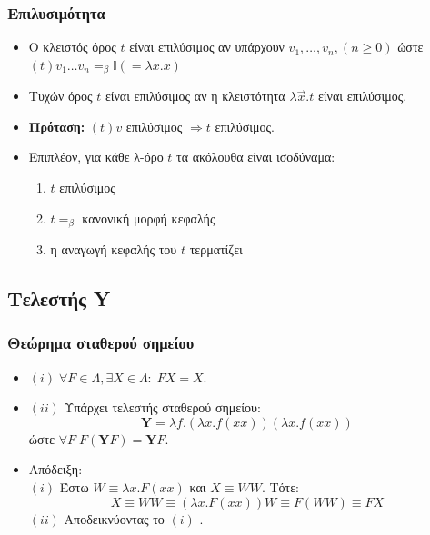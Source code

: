 \documentclass{beamer}
\begin{document}
\begin{frame}
  \frametitle{Επιλυσιμότητα}
  \begin{itemize}
  \item Ο κλειστός όρος $t$ είναι επιλύσιμος αν υπάρχουν $v_1, \ldots,
    v_n, (n \geqslant 0)$ ώστε $ (t) v_1 \ldots v_n =_\beta \mathbb{I}
    (=\lambda x.x) $ \pause
  \item Τυχών όρος $t$ είναι επιλύσιμος αν η κλειστότητα $\lambda
    \overrightarrow{x} . t$ είναι επιλύσιμος. \pause
  \item \textbf{Πρόταση:} $(t) v$ επιλύσιμος $ \Rightarrow t$
    επιλύσιμος. \pause
  \item Επιπλέον, για κάθε λ-όρο $t$ τα ακόλουθα είναι ισοδύναμα:
    \begin{enumerate}
    \item $t$ επιλύσιμος
    \item $t =_\beta$ κανονική μορφή κεφαλής
    \item η αναγωγή κεφαλής του $t$ τερματίζει 	
    \end{enumerate}
  \end{itemize}
\end{frame}

\subsection{Τελεστής Y}

\begin{frame}
  \frametitle{Θεώρημα σταθερού σημείου}
  \begin{itemize}
  \item $ (i) \; \forall F \in \Lambda , \exists X \in \Lambda: \; F X
    = X. $ \pause
  \item $ (ii) $ Υπάρχει τελεστής σταθερού σημείου:
    \[ \textbf{Y} = \lambda f . (\lambda x . f (xx)) (\lambda x . f (xx)) \]
    ώστε $ \forall F \; F (\textbf{Y} F) = \textbf{Y} F $. \pause
  \item Απόδειξη: \\
    $ (i) $ Έστω $ W \equiv \lambda x . F (xx) $ και $ X \equiv W W $. Τότε:
    \[ X \equiv W W \equiv (\lambda x . F (xx)) W \equiv F (WW) \equiv F X \] \pause
    $ (ii) $ Αποδεικνύοντας το $ (i) $ .
  \end{itemize}
\end{frame}
\end{document}

